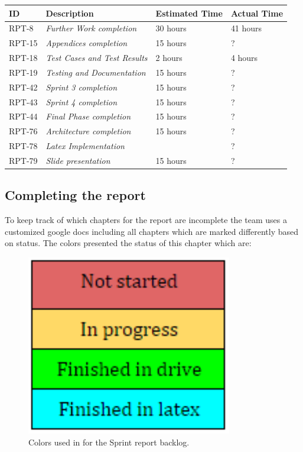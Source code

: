 \begin{minipage}{\linewidth}
\setlength{\tabcolsep}{12pt}
\centering
{}
\begin{tabular}{|p{1cm}|p{4cm}|p{2cm}|p{2cm}|}
\hline
\cellcolor{gray!25} ID & \cellcolor{gray!25} Description & \cellcolor{gray!25} Estimated Time & \cellcolor{gray!25} Actual Time \\
\hline
RPT-8 & \it{Further Work completion} & 30 hours & 41 hours\\
RPT-15 & \it{Appendices completion} & 15 hours & ? \\
RPT-18 & \it{Test Cases and Test Results} &  2 hours & 4 hours \\
RPT-19 & \it{Testing and Documentation} & 15 hours & ? \\
RPT-42 & \it{Sprint 3 completion} & 15 hours & ? \\
RPT-43 & \it{Sprint 4 completion} & 15 hours & ? \\
RPT-44 & \it{Final Phase completion} & 15 hours & ? \\
RPT-76 & \it{Architecture completion} & 15 hours & ? \\
RPT-78 & \it{Latex Implementation} &  & ? \\
RPT-79 & \it{Slide presentation} & 15 hours & ? \\
\hline
\end{tabular}
\end{minipage}

\subsection{Completing the report}
\label{sec:FinalReport}

To keep track of which chapters for the report are incomplete the team uses a customized google docs including all chapters which are marked differently based on status. The colors presented the status of this chapter which are:

\begin{figure}[ht!]
\centering
\includegraphics[width=90mm]{./FinalSprint/img/Colors.png}
\caption{Colors used in for the Sprint report backlog. \label{fig:FinalColors}}
\end{figure}

